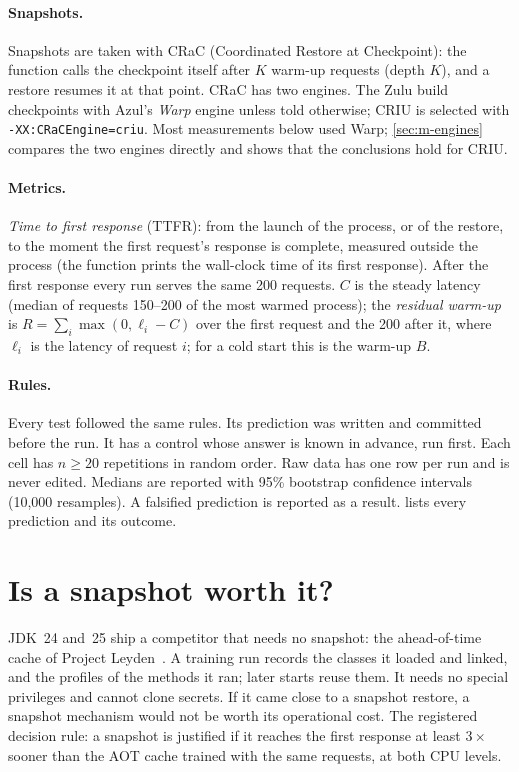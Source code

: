 \paragraph{Snapshots.} Snapshots are taken with CRaC (Coordinated Restore at Checkpoint): the
function calls the checkpoint itself after $K$ warm-up requests (depth $K$), and a restore resumes
it at that point. CRaC has two engines. The Zulu build checkpoints with Azul's \emph{Warp} engine
unless told otherwise; CRIU is selected with \texttt{-XX:CRaCEngine=criu}. Most measurements below
used Warp; \cref{sec:m-engines} compares the two engines directly and shows that the conclusions
hold for CRIU.

\paragraph{Metrics.} \emph{Time to first response} (TTFR): from the launch of the process, or of
the restore, to the moment the first request's response is complete, measured outside the process
(the function prints the wall-clock time of its first response). After the first response every
run serves the same 200 requests. $C$ is the steady latency (median of requests 150--200 of the
most warmed process); the \emph{residual warm-up} is $R = \sum_i \max(0, \ell_i - C)$ over the first
request and the 200 after it, where $\ell_i$ is the latency of request $i$; for a cold start this
is the warm-up $B$.

\paragraph{Rules.} Every test followed the same rules. Its prediction was written and committed
before the run. It has a control whose answer is known in advance, run first. Each cell has
$n \ge 20$ repetitions in random order. Raw data has one row per run and is never edited. Medians
are reported with 95\% bootstrap confidence intervals (10{,}000 resamples). A falsified
prediction is reported as a result.  lists every prediction and its outcome.

\section{Is a snapshot worth it?}
\label{sec:m-aot}

JDK~24 and~25 ship a competitor that needs no snapshot: the ahead-of-time cache of Project
Leyden~\cite{jep483,jep514,jep515}. A training run records the classes it loaded and linked, and
the profiles of the methods it ran; later starts reuse them. It needs no special privileges and
cannot clone secrets. If it came close to a snapshot restore, a snapshot mechanism would not be
worth its operational cost. The registered decision rule: a snapshot is justified if it reaches the
first response at least $3\times$ sooner than the AOT cache trained with the same requests, at both
CPU levels.

